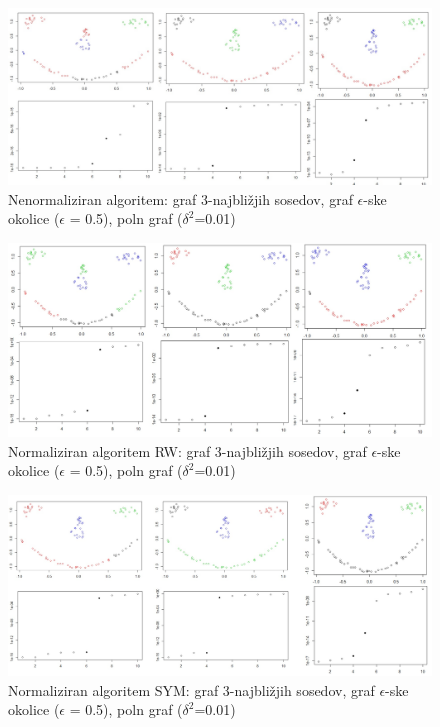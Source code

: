 \documentclass[a4paper, 10pt]{article}
\begin{document}
\begin{figure}[h]
\caption{Nenormaliziran algoritem: graf 3-najbližjih sosedov, graf $\epsilon$-ske okolice ($\epsilon$ = 0.5), poln graf ($\delta^2$=0.01)}
\includegraphics[width=\textwidth]{unnorm-smiley}
\end{figure}

\begin{figure}[h]
\caption{Normaliziran algoritem RW: graf 3-najbližjih sosedov, graf $\epsilon$-ske okolice ($\epsilon$ = 0.5), poln graf ($\delta^2$=0.01)}
\includegraphics[width=\textwidth]{norm-smiley}
\end{figure}

\begin{figure}[h]
\caption{Normaliziran algoritem SYM: graf 3-najbližjih sosedov, graf $\epsilon$-ske okolice ($\epsilon$ = 0.5), poln graf ($\delta^2$=0.01)}
\includegraphics[width=\textwidth]{norm-smiley-sym}
\end{figure}
\end{document}
